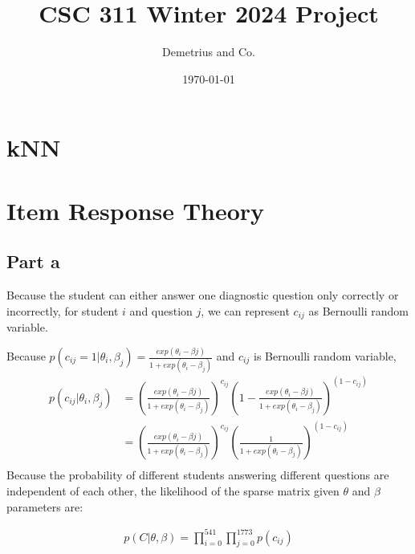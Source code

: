 \documentclass[12pt]{article}
\title{CSC 311 Winter 2024 Project}
\author{Demetrius and Co.}
\date{\today}
\begin{document}
\maketitle

\tableofcontents

\newpage
\section{kNN}
\section{Item Response Theory}
\subsection{Part a}
Because the student can either answer one diagnostic question only correctly or incorrectly, for student $i$ and question $j$, we can represent $c_{ij}$ as Bernoulli random variable.

Because $p(c_{ij}=1|\theta_{i},\beta_{j})=\frac{exp(\theta_{i}-\beta{j})}{1+exp(\theta_{i} - \beta_{j})}$ and $c_{ij}$ is Bernoulli random variable,
\[
\begin{split}
p(c_{ij}|\theta_{i},\beta_{j})&=(\frac{exp(\theta_{i}-\beta{j})}{1+exp(\theta_{i} - \beta_{j})})^{c_{ij}}(1-\frac{exp(\theta_{i}-\beta{j})}{1+exp(\theta_{i} - \beta_{j})})^{(1-c_{ij})}\\
     &=(\frac{exp(\theta_{i}-\beta{j})}{1+exp(\theta_{i} - \beta_{j})})^{c_{ij}}(\frac{1}{1+exp(\theta_{i} - \beta_{j})})^{(1-c_{ij})}\\
 \end{split}
\]
Because the probability of different students answering different questions are independent of each other, the likelihood of the sparse matrix given $\theta$ and $\beta$ parameters are:

\[
\begin{split}
p(C|\theta,\beta)=\prod_{i=0}^{541}\prod_{j=0}^{1773} p(c_{ij})
 \end{split}
\]
\end{document}
